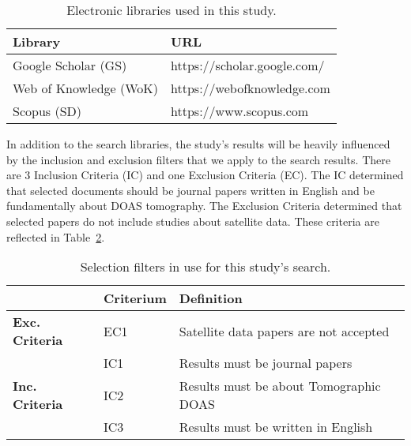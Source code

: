 \begin{table}[htb]
\centering
\caption{Electronic libraries used in this study.}
\label{tab:libraries}
    \begin{tabularx}{\textwidth}{ll}
        \toprule
        \textbf{Library}          & \textbf{URL}\\
        \midrule
        Google Scholar (GS)   & https://scholar.google.com/\\
        Web of Knowledge (WoK)& https://webofknowledge.com\\
        Scopus (SD)   & https://www.scopus.com\\
        \bottomrule
    \end{tabularx}
\end{table}

In addition to the search libraries, the study's results will be heavily
influenced by the inclusion and exclusion filters that we apply to the
search results. There are 3 Inclusion Criteria (IC) and one Exclusion
Criteria (EC). The IC determined that selected documents should be
journal papers written in English and be fundamentally about DOAS
tomography. The Exclusion Criteria determined that selected papers do
not include studies about satellite data. These criteria are reflected
in Table~\ref{tab:select_filters}.

\begin{table}[htb]
\centering
\caption{Selection filters in use for this study's search.}
\label{tab:select_filters}
\begin{tabularx}{\textwidth}{lXl}%
\toprule
\multicolumn{1}{l}{} & \textbf{Criterium} & \textbf{Definition} \\ \midrule
\multirow{1}{*}{\textbf{Exc. Criteria}} & EC1 & Satellite data papers
are not accepted \\
\midrule
\multicolumn{1}{l}{\multirow{3}{*}{\textbf{Inc. Criteria}}} & IC1 &
Results must be journal papers \\
\multicolumn{1}{l}{} & IC2 & Results must be about Tomographic DOAS \\ 
\multicolumn{1}{l}{} & IC3 & Results must be written in English \\ 
\bottomrule
\end{tabularx}
\end{table}


